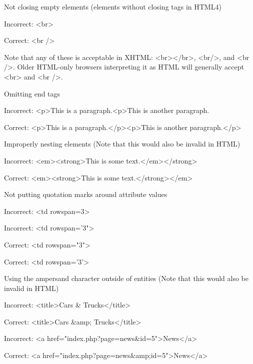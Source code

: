 \begin{compactitem}
\item Not closing empty elements (elements without closing tags in HTML4)

	\begin{compactitem}
	\item Incorrect: <br>
	\item Correct: <br />
	\end{compactitem}

Note that any of these is acceptable in XHTML: <br></br>, <br/>, and <br />. Older HTML-only browsers interpreting it as HTML will generally accept <br> and <br />.

\item Omitting end tags

	\begin{compactitem}
	\item Incorrect: <p>This is a paragraph.<p>This is another paragraph.
	\item Correct: <p>This is a paragraph.</p><p>This is another paragraph.</p>
	\end{compactitem}

\item Improperly nesting elements (Note that this would also be invalid in HTML)

	\begin{compactitem}
	\item Incorrect: <em><strong>This is some text.</em></strong>
	\item Correct: <em><strong>This is some text.</strong></em>
	\end{compactitem}

\item Not putting quotation marks around attribute values

	\begin{compactitem}
	\item Incorrect: <td rowspan=3>
	\item Incorrect: <td rowspan='3">
	\item Correct: <td rowspan="3">
	\item Correct: <td rowspan='3'>
	\end{compactitem}
	
\item Using the ampersand character outside of entities (Note that this would also be invalid in HTML)

	\begin{compactitem}
	\item Incorrect: <title>Cars \& Trucks</title>
	\item Correct: <title>Cars \&amp; Trucks</title>
	\item Incorrect: <a href="index.php?page=news\&id=5">News</a>
	\item Correct: <a href="index.php?page=news\&amp;id=5">News</a>
	\end{compactitem}


\end{compactitem}
